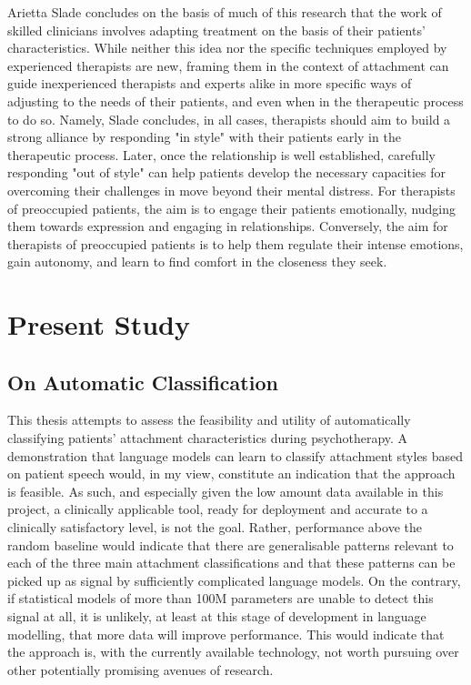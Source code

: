 \documentclass[12pt]{report}
\begin{document}
Arietta Slade \cite{Slade2016} concludes on the basis of much of this research that the work of skilled clinicians involves adapting treatment on the basis of their patients' characteristics. While neither this idea nor the specific techniques employed by experienced therapists are new, framing them in the context of attachment can guide inexperienced therapists and experts alike in more specific ways of adjusting to the needs of their patients, and even when in the therapeutic process to do so.
Namely, Slade concludes, in all cases, therapists should aim to build a strong alliance by responding "in style" with their patients early in the therapeutic process. Later, once the relationship is well established, carefully responding "out of style" can help patients develop the necessary capacities for overcoming their challenges in move beyond their mental distress. For therapists of preoccupied patients, the aim is to engage their patients emotionally, nudging them towards expression and engaging in relationships.
Conversely, the aim for therapists of preoccupied patients is to help them regulate their intense emotions, gain autonomy, and learn to find comfort in the closeness they seek.

\chapter{Present Study}
\section{On Automatic Classification}
This thesis attempts to assess the feasibility and utility of automatically classifying patients' attachment characteristics during psychotherapy.
A demonstration that language models can learn to classify attachment styles based on patient speech would, in my view, constitute an indication that the approach is feasible.
As such, and especially given the low amount data available in this project, a clinically applicable tool, ready for deployment and accurate to a clinically satisfactory level, is not the goal.
Rather, performance above the random baseline would indicate that there are generalisable patterns relevant to each of the three main attachment classifications and that these patterns can be picked up as signal by sufficiently complicated language models.
On the contrary, if statistical models of more than 100M parameters are unable to detect this signal at all, it is unlikely, at least at this stage of development in language modelling, that more data will improve performance.
This would indicate that the approach is, with the currently available technology, not worth pursuing over other potentially promising avenues of research.
\end{document}
